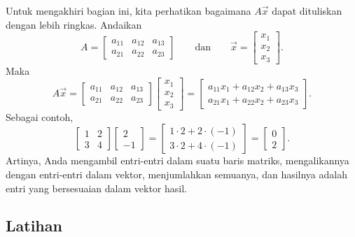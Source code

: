 Untuk mengakhiri bagian ini, kita perhatikan bagaimana $A \vec{x}$ dapat dituliskan dengan lebih ringkas.
Andaikan
\begin{equation*}
A =
\begin{bmatrix}
a_{11} & a_{12} & a_{13} \\
a_{21} & a_{22} & a_{23}
\end{bmatrix}
\qquad \text{dan} \qquad
\vec{x} =
\begin{bmatrix}
x_1 \\ x_2 \\ x_3
\end{bmatrix} .
\end{equation*}
Maka
\begin{equation*}
A \vec{x} =
\begin{bmatrix}
a_{11} & a_{12} & a_{13} \\
a_{21} & a_{22} & a_{23}
\end{bmatrix}
\begin{bmatrix}
x_1 \\ x_2 \\ x_3
\end{bmatrix}
=
\begin{bmatrix}
a_{11} x_1 + a_{12} x_2 + a_{13} x_3 \\
a_{21} x_1 + a_{22} x_2 + a_{23} x_3
\end{bmatrix}  .
\end{equation*}
Sebagai contoh,
\begin{equation*}
\begin{bmatrix}
1 & 2 \\ 3 & 4
\end{bmatrix}
\begin{bmatrix}
2 \\ -1
\end{bmatrix}
=
\begin{bmatrix}
1 \cdot 2 + 2 \cdot (-1) \\
3 \cdot 2 + 4 \cdot (-1)
\end{bmatrix}
=
\begin{bmatrix}
0 \\ 2
\end{bmatrix}  .
\end{equation*}
Artinya, Anda mengambil entri-entri dalam suatu baris matriks, mengalikannya dengan
entri-entri dalam vektor, menjumlahkan semuanya, dan hasilnya adalah entri yang bersesuaian
dalam vektor hasil.


\subsection{Latihan}

